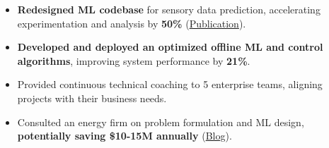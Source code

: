 {
}
\begin{itemize}
    \item \textbf{Redesigned ML codebase} for sensory data prediction, accelerating experimentation and analysis by \textbf{50\%} (\href{https://link.springer.com/article/10.1007/s10994-023-06413-x}{Publication}).
    \item \textbf{Developed and deployed an optimized offline ML and control algorithms}, improving system performance by \textbf{21\%}.
\end{itemize}

{
}

    
\begin{itemize}
    \item Provided continuous technical coaching to 5 enterprise teams, aligning projects with their business needs.
    \item Consulted an energy firm on problem formulation and ML design, \textbf{potentially saving \$10-15M annually} (\href{https://www.amii.ca/latest-from-amii/venturi-uses-machine-learning-reduce-emissions-increase-safety-pipelines/}{Blog}).
\end{itemize}

